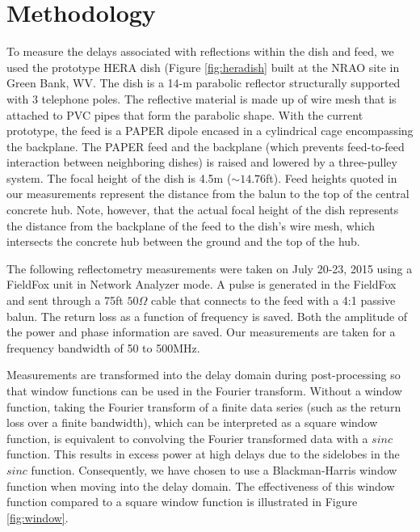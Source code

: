 \documentclass[12pt,preprint]{aastex}
\begin{document}
\section{Methodology}

To measure the delays associated with reflections within the dish and feed, we
used the prototype HERA dish (Figure \ref{fig:heradish} built at the NRAO site in
Green Bank, WV. The dish is a 14-m parabolic reflector structurally supported
with 3 telephone poles. The reflective material is made up of wire mesh that
is attached to PVC pipes that form the parabolic shape. With the current
prototype, the feed is a PAPER dipole encased in a cylindrical cage encompassing
the backplane. The PAPER feed and the backplane (which prevents feed-to-feed
interaction between neighboring dishes) is raised and lowered by a three-pulley
system. The focal height of the dish is 4.5m ($\sim{14.76}$ft). Feed heights quoted in our measurements represent the distance from the balun to the top of the central concrete hub. Note, however, that the actual focal height of the dish represents the distance from the backplane of the feed to the dish's wire mesh, which intersects the concrete hub between the ground and the top of the hub. 

The following reflectometry measurements were taken on July 20-23, 2015 using a
FieldFox unit in Network Analyzer mode. A pulse is generated in the FieldFox
and sent through a 75ft $50\Omega$ cable that connects to the feed with a 4:1
passive balun. The return loss as a function of frequency is saved. Both
the amplitude of the power and phase information are saved. Our
measurements are taken for a frequency bandwidth of 50 to 500MHz. 

Measurements are transformed into the delay domain during post-processing so that window functions
can be used in the Fourier transform. Without a window function, taking the Fourier transform of a finite data series (such as the return loss over a finite bandwidth), which can be interpreted as a square window function, is equivalent to convolving the Fourier transformed data with a $sinc$ function. This results in excess power at high delays due to the sidelobes in the $sinc$ function. Consequently, we have chosen to use a Blackman-Harris window function when moving into the delay domain. The effectiveness of this window function compared to a square window function is illustrated in Figure \ref{fig:window}.
\end{document}
